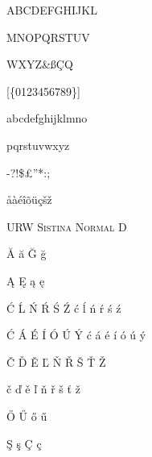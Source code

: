 \documentclass{article}
\begin{document}
\thispagestyle{empty}

\fontsize{48}{56}\selectfont

\begin{centering}

ABCDEFGHIJKL

MNOPQRSTUV

WXYZ\&{\ss}\c{C}{\selectfont Q}

[\{{\guillemotleft}0123456789{\guillemotright}\}]

abcdefghijklmno

pqrstuvwxyz

-?{\textquestiondown}!\${\pounds}''*:;{\texttrademark}{\textdagger}{\textdaggerdbl}

\textcolor{red}{\textparagraph}

\r{a}\`{a}\'{e}\^{i}\~{o}\"{u}\c{c}\v{s}\v{z}

{\fontsize{12}{12}\selectfont \textsc{URW Sistina Normal D}}

\end{centering}

\clearpage

\fontsize{24}{18}\selectfont


\u{A} \u{a} \u{G} \u{g}


\k{A} \k{E} \k{a} \k{e}


\'{C} \'{L} \'{N} \'{R} \'{S} \'{Z} \'{c} \'{l} \'{n} \'{r} \'{s} \'{z}

\'{C} \'{A} \'{E} \'{I} \'{O} \'{U} \'{Y} \'{c} \'{a} \'{e} \'{i} \'{o} \'{u} \'{y}


\v{C} \v{D} \v{E} \v{L} \v{N} \v{R} \v{S} \v{T} \v{Z}

\v{c} \v{d} \v{e} \v{l} \v{n} \v{r} \v{s} \v{t} \v{z}


\H{O} \H{U} \H{o} \H{u}


\c{S} \c{s} \c{C} \c{c}
\end{document}
